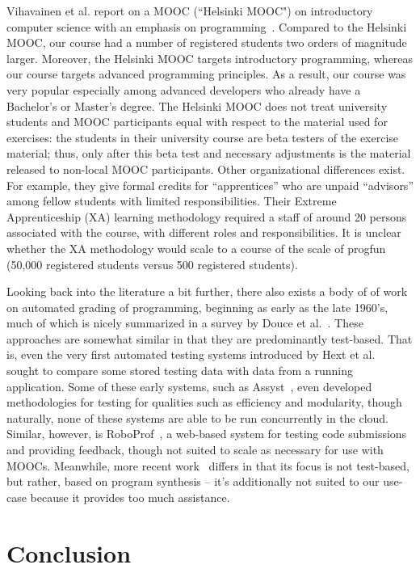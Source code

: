 \documentclass{sig-alternate}
\begin{document}
Vihavainen et al. report on a MOOC (``Helsinki MOOC") on introductory computer
science with an emphasis on programming~\cite{VihavainenLK12}. Compared to the
Helsinki MOOC, our course had a number of registered students two orders of
magnitude larger. Moreover, the Helsinki MOOC targets introductory
programming, whereas our course targets advanced programming principles. As a
result, our course was very popular especially among advanced developers who
already have a Bachelor's or Master's degree. The Helsinki MOOC does not treat
university students and MOOC participants equal with respect to the material
used for exercises: the students in their university course are beta testers
of the exercise material; thus, only after this beta test and necessary
adjustments is the material released to non-local MOOC participants. Other
organizational differences exist. For example, they give formal credits for
``apprentices'' who are unpaid ``advisors'' among fellow students with limited
responsibilities. Their Extreme Apprenticeship (XA) learning methodology
required a staff of around 20 persons associated with the course, with
different roles and responsibilities. It is unclear whether the XA methodology
would scale to a course of the scale of progfun (50,000 registered students
versus 500 registered students).

Looking back into the literature a bit further, there also exists a body of
of work on automated grading of programming, beginning as early as the late 1960's,
much of which is nicely summarized in a survey by Douce et al.~\cite{Douce}. These approaches
are somewhat similar in that they are predominantly test-based. That is, even the very
first automated testing systems introduced by Hext et al.~\cite{Hext69} sought to compare
some stored testing data with data from a running application. Some of these early systems,
such as Assyst~\cite{Assyst}, even developed methodologies for testing for qualities such as
efficiency and modularity, though naturally, none of these systems are able to be run
concurrently in the cloud. Similar, however, is RoboProf~\cite{RoboProf}, a web-based system for
testing code submissions and providing feedback, though not suited to scale as necessary for use with MOOCs.
Meanwhile, more recent work~\cite{PLDI13} differs in that its focus is not test-based, but
rather, based on program synthesis – it's additionally not suited to our use-case because it
provides too much assistance.

\section{Conclusion}
\label{sec:conclusion}
\end{document}
